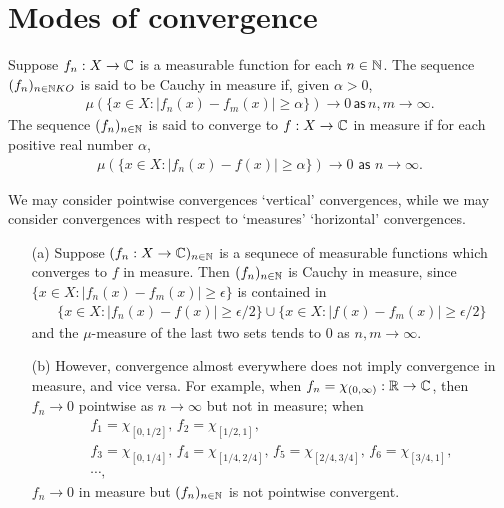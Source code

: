 \section{Modes of convergence}

\begin{defi}
    Suppose $f_n: X\rightarrow {\mathbb{C}}$ is a measurable function for each $n\in{\mathbb{N}}$.
    The sequence $(f_n)_{n\in{\mathbb{N}}KO}$ is said to be Cauchy in measure if, given $\alpha>0$,
    \begin{align*}
        \mu(\{x\in X: |f_n(x)-f_m(x)|\geq\alpha\})\rightarrow 0
        \,\textsf{as}\,
        n, m\rightarrow\infty.
    \end{align*}
    The sequence $(f_n)_{n\in{\mathbb{N}}}$ is said to converge to $f: X\rightarrow{\mathbb{C}}$ in measure if for each positive real number $\alpha$,
    \begin{align*}
        \mu(\{x\in X: |f_n(x)-f(x)|\geq\alpha\})\rightarrow 0\textsf{ as }n\rightarrow\infty.
    \end{align*}
\end{defi}
\begin{rmk}
    We may consider pointwise convergences `vertical' convergences, while we may consider convergences with respect to `measures' `horizontal' convergences.
\end{rmk}
\begin{rmk}
    \begin{enumerate}
        \item[(a)]
        {
            Suppose $(f_n: X\rightarrow{\mathbb{C}})_{n\in{\mathbb{N}}}$ is a sequnece of measurable functions which converges to $f$ in measure.
            Then $(f_n)_{n\in{\mathbb{N}}}$ is Cauchy in measure, since $\{x\in X: |f_n(x)-f_m(x)|\geq\epsilon\}$ is contained in
            \begin{align*}
                \{x\in X: |f_n(x)-f(x)|\geq\epsilon/2\}\cup\{x\in X: |f(x)-f_m(x)|\geq\epsilon/2\}
            \end{align*}
            and the $\mu$-measure of the last two sets tends to 0 as $n, m\rightarrow\infty$.
        }
        \item[(b)]
        {
            However, convergence almost everywhere does not imply convergence in measure, and vice versa.
            For example, when $f_n=\chi_{(0, \infty)}: {\mathbb{R}}\rightarrow{\mathbb{C}}$, then $f_n\rightarrow 0$ pointwise as $n\rightarrow\infty$ but not in measure; when 
            \begin{eqnarray*}
                &f_1=\chi_{[0, 1/2]},\, f_2=\chi_{[1/2, 1]},&\\
                &f_3=\chi_{[0, 1/4]},\, f_4=\chi_{[1/4, 2/4]},\, f_5=\chi_{[2/4, 3/4]},\, f_6=\chi_{[3/4, 1]},&\\
                &\cdots,&
            \end{eqnarray*}
            $f_n\rightarrow 0$ in measure but $(f_n)_{n\in{\mathbb{N}}}$ is not pointwise convergent.
        }
    \end{enumerate}
\end{rmk}
